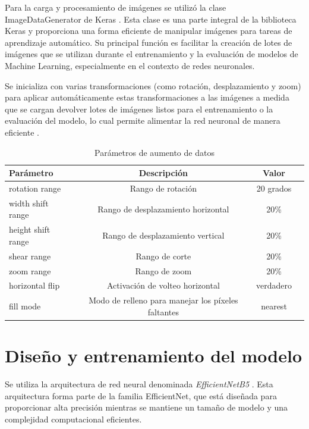 Para la carga y procesamiento de imágenes se utilizó la clase ImageDataGenerator de Keras . Esta clase es una parte integral de la biblioteca Keras y proporciona una forma eficiente de manipular imágenes para tareas de aprendizaje automático. Su principal función es facilitar la creación de lotes de imágenes que se utilizan durante el entrenamiento y la evaluación de modelos de Machine Learning, especialmente en el contexto de redes neuronales. 

Se inicializa con varias transformaciones (como rotación, desplazamiento y zoom) para aplicar automáticamente estas transformaciones a las imágenes a medida que se cargan devolver lotes de imágenes listos para el entrenamiento o la evaluación del modelo, lo cual permite alimentar la red neuronal de manera eficiente .

\begin{table}[h]
   \centering
   \begin{tabular}{lccc}
   \hline
   Parámetro & Descripción  & Valor \\ \hline
   rotation range & 	Rango de rotación & 20 grados \\
   width shift range & Rango de desplazamiento horizontal & 20\% \\
   height shift range & Rango de desplazamiento vertical & 20\% \\
   shear range & 	Rango de corte & 20\% \\
   zoom range & Rango de zoom & 20\% \\
   horizontal flip & Activación de volteo horizontal & verdadero \\
   fill mode & Modo de relleno para manejar los píxeles faltantes & nearest \\ \hline
   \end{tabular}
   \caption{Parámetros de aumento de datos}
   \label{tab:data_augmentation_params}
   \end{table}

\section{Diseño y entrenamiento del modelo}

Se utiliza la arquitectura de red neural denominada \textit{EfficientNetB5} . Esta arquitectura forma parte de la familia EfficientNet, que está diseñada para proporcionar alta precisión mientras se mantiene un tamaño de modelo y una complejidad computacional eficientes.

